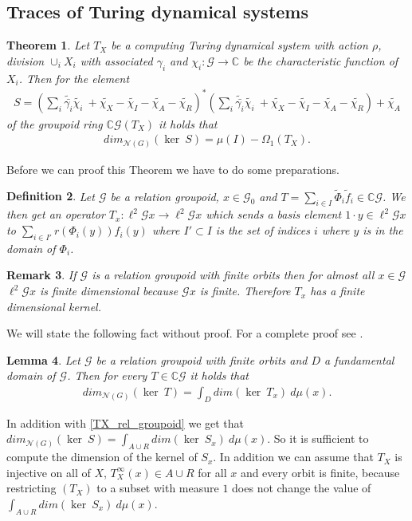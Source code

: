 \documentclass[12pt,a4paper]{scrartcl}
\newtheorem{Theorem}{Theorem}[section]
\newtheorem{Definition}[Theorem]{Definition}
\newtheorem{Lemma}[Theorem]{Lemma}
\newtheorem{Remark}[Theorem]{Remark}
\numberwithin{equation}{section}
\newcommand{\C}{\mathbb{C}} %
\newcommand{\2}{\mathbb{Z} / 2 \mathbb{Z}}
\newcommand{\G}{\mathcal{G}}
\newcommand{\1}{\bar{1}}
\newcommand{\0}{\bar{0}}
\begin{document}
\subsection{Traces of Turing dynamical systems}
\begin{Theorem} \label{groserSatz}
	Let $T_X$ be a computing Turing dynamical system with action $\rho$, division $\cup_i X_i$ with associated $\gamma_i$ and $\chi_i : \G \to \C$ be the characteristic function of $X_i$. Then for the element
	\begin{align*}
		S = (\sum_{i} \tilde{\bar{\gamma_i}} \tilde{\chi_i} \ + \tilde{\chi_X} - \tilde{\chi_I} - \tilde{\chi_A} - \tilde{\chi_R})^*(\sum_{i} \tilde{\bar{\gamma_i}} \tilde{\chi_i} \ + \tilde{\chi_X} - \tilde{\chi_I} - \tilde{\chi_A} - \tilde{\chi_R}) + \tilde{\chi_A}
	\end{align*}
	of the groupoid ring $\C \G(T_X)$ it holds that
	\begin{align*}
		dim_{\mathcal{N}(G)}(\ker \ S) = \mu(I) - \Omega_1(T_X).
	\end{align*}
\end{Theorem}
Before we can proof this Theorem we have to do some preparations. 
\begin{Definition}
	Let $\G$ be a relation groupoid, $x \in \G_0$ and $T = \sum_{i \in I} \tilde \Phi_i\tilde f_i \in \C\G$. We then get an operator $T_x: \ell^2\G x \to \ell^2\G x$ which sends a basis element $1 \cdot y \in \ell^2\G x$ to $\sum_{i \in I'} r(\Phi_i(y)) f_i(y)$ where $I' \subset I$ is the set of indices $i$ where $y$ is in the domain of $\Phi_i$. 
\end{Definition}
\begin{Remark}
	If $\G$ is a relation groupoid with finite orbits then for almost all $x \in \G$ $\ell^2\G x$ is finite dimensional because $\G x$ is finite. Therefore $T_x$ has a finite dimensional kernel.
\end{Remark}
We will state the following fact without proof. For a complete proof see \cite{GRAB}.
\begin{Lemma}
	Let $\G$ be a relation groupoid with finite orbits and $D$ a fundamental domain of $\G$. Then for every $T \in \C \G$ it holds that
	\begin{align*}
		dim_{\mathcal{N}(G)}(\ker \ T) = \int_D dim (\ker \ T_x) \ d \mu (x).
	\end{align*} 
\end{Lemma}
In addition with \ref{TX_rel_groupoid} we get that $dim_{\mathcal{N}(G)}(\ker \ S) = \int_{A \cup R} dim (\ker \ S_x) \ d \mu (x)$. So it is sufficient to compute the dimension of the kernel of $S_x$. In addition we can assume that $T_X$ is injective on all of $X$, $T_X^\infty(x) \in A \cup R$ for all $x$ and every orbit is finite, because restricting $(T_X)$ to a subset with measure $1$ does not change the value of $\int_{A \cup R} dim (\ker \ S_x) \ d \mu (x)$. 
\end{document}
